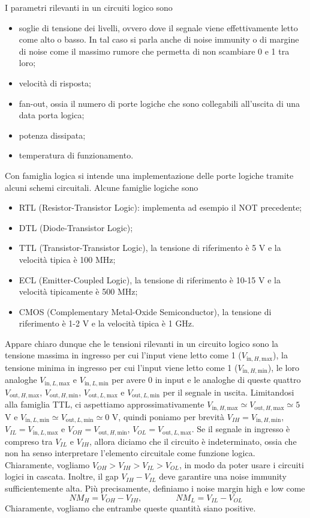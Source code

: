 \documentclass[a4paper, 11pt]{article}
\renewcommand{\sf}{\textsf}
\begin{document}
I parametri rilevanti in un circuiti logico sono
\begin{itemize}
	\item soglie di tensione dei livelli, ovvero dove il segnale viene effettivamente letto come alto o basso. In tal caso si parla anche di noise immunity o di margine di noise come il massimo rumore che permetta di non scambiare 0 e 1 tra loro;
	\item velocità di risposta;
	\item fan-out, ossia il numero di porte logiche che sono collegabili all'uscita di una data porta logica;
	\item potenza dissipata;
	\item temperatura di funzionamento.
\end{itemize}
Con famiglia logica si intende una implementazione delle porte logiche tramite alcuni schemi circuitali. Alcune famiglie logiche sono
\begin{itemize}
	\item RTL (Resistor-Transistor Logic): implementa ad esempio il \sf{NOT} precedente;
	\item DTL (Diode-Transistor Logic);
	\item TTL (Transistor-Transistor Logic), la tensione di riferimento è 5 V e la velocità tipica è 100 MHz;
	\item ECL (Emitter-Coupled Logic), la tensione di riferimento è 10-15 V e la velocità tipicamente è 500 MHz;
	\item CMOS (Complementary Metal-Oxide Semiconductor), la tensione di riferimento è 1-2 V e la velocità tipica è 1 GHz.
\end{itemize}

Appare chiaro dunque che le tensioni rilevanti in un circuito logico sono la tensione massima in ingresso per cui l'input viene letto come 1 ($V_{\text{in},H,\text{max}}$), la tensione minima in ingresso per cui l'input viene letto come 1 ($V_{\text{in},H,\text{min}}$), le loro analoghe $V_{\text{in},L,\text{max}}$ e $V_{\text{in},L,\text{min}}$ per avere 0 in input e le analoghe di queste quattro $V_{\text{out},H,\text{max}}$, $V_{\text{out},H,\text{min}}$, $V_{\text{out},L,\text{max}}$ e $V_{\text{out},L,\text{min}}$ per il segnale in uscita. Limitandosi alla famiglia TTL, ci aspettiamo approssimativamente $V_{\text{in},H,\text{max}}\simeq V_{\text{out},H,\text{max}}\simeq 5$ V e $V_{\text{in},L,\text{min}}\simeq V_{\text{out},L,\text{min}}\simeq 0$ V, quindi poniamo per brevità $V_{IH}=V_{\text{in},H,\text{min}}$, $V_{IL}=V_{\text{in},L,\text{max}}$ e $V_{OH}=V_{\text{out},H,\text{min}}$, $V_{OL}=V_{\text{out},L,\text{max}}$. Se il segnale in ingresso è compreso tra $V_{IL}$ e $V_{IH}$, allora diciamo che il circuito è indeterminato, ossia che non ha senso interpretare l'elemento circuitale come funzione logica. Chiaramente, vogliamo $V_{OH}>V_{IH}>V_{IL}>V_{OL}$, in modo da poter usare i circuiti logici in cascata. Inoltre, il gap $V_{IH}-V_{IL}$ deve garantire una noise immunity sufficientemente alta. Più precisamente, definiamo i noise margin high e low come
\[NM_H=V_{OH}-V_{IH},\qquad\qquad NM_L=V_{IL}-V_{OL}\]
Chiaramente, vogliamo che entrambe queste quantità siano positive.
\end{document}
